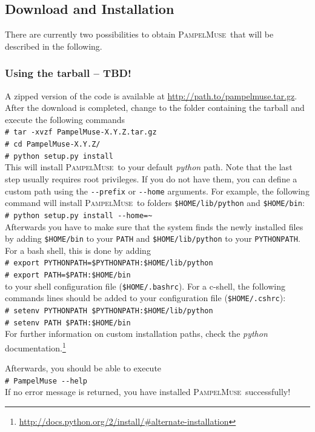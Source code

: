 \documentclass[a4paper,10pt]{article}
\newcommand{\shellcmd}[1]{\\\indent\indent\texttt{\footnotesize\# #1}}
\newcommand{\pampelmuse}{\textsc{PampelMuse}\ }
\begin{document}
\subsection{Download and Installation}

There are currently two possibilities to obtain \pampelmuse that will be described in the following.

\subsubsection{Using the tarball -- TBD!}
\label{sec:install:tarball}

A zipped version of the code is available at \url{http://path.to/pampelmuse.tar.gz}. After the download is completed, change to the folder containing the tarball and execute the following commands
\shellcmd{tar -xvzf PampelMuse-X.Y.Z.tar.gz}
\shellcmd{cd PampelMuse-X.Y.Z/}
\shellcmd{python setup.py install} \\
This will install \pampelmuse to your default \textit{python} path. Note that the last step usually requires root privileges. If you do not have them, you can define a custom path using the \texttt{-{}-prefix} or \texttt{-{}-home} arguments. For example, the following command will install \pampelmuse to folders \texttt{\$HOME/lib/python} and \texttt{\$HOME/bin}:
\shellcmd{python setup.py install -{}-home=\~{}} \\
Afterwards you have to make sure that the system finds the newly installed files by adding \texttt{\$HOME/bin} to your \texttt{PATH} and \texttt{\$HOME/lib/python} to your \texttt{PYTHONPATH}. For a bash shell, this is done by adding
\shellcmd{export PYTHONPATH=\$PYTHONPATH:\$HOME/lib/python}
\shellcmd{export PATH=\$PATH:\$HOME/bin}\\
to your shell configuration file (\texttt{\$HOME/.bashrc}). For a c-shell, the following commands lines should be added to your configuration file (\texttt{\$HOME/.cshrc}):
\shellcmd{setenv PYTHONPATH \$PYTHONPATH:\$HOME/lib/python}
\shellcmd{setenv PATH \$PATH:\$HOME/bin}\\
For further information on custom installation paths, check the \textit{python} documentation.\footnote{\url{http://docs.python.org/2/install/\#alternate-installation}}

Afterwards, you should be able to execute
\shellcmd{PampelMuse -{}-help} \\
If no error message is returned, you have installed \pampelmuse successfully!
\end{document}
